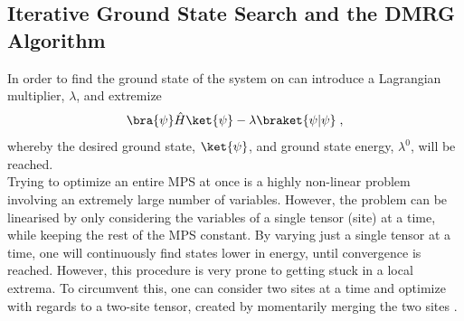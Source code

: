 \subsection{Iterative Ground State Search and the DMRG Algorithm} \label{sec:DMRG}
In order to find the ground state of the system on can introduce a Lagrangian multiplier, $\lambda$, and extremize
\begin{equation}
	\bra{\psi} \hat{H} \ket{\psi} - \lambda \braket{\psi | \psi} \; ,
	\label{eq:lagrange}
\end{equation}
whereby the desired ground state, $\ket{\psi}$, and ground state energy, $\lambda^0$, will be reached.\\
Trying to optimize an entire MPS at once is a highly non-linear problem involving an extremely large number of variables. However, the problem can be linearised by only considering the variables of a single tensor (site) at a time, while keeping the rest of the MPS constant. By varying just a single tensor at a time, one will continuously find states lower in energy, until convergence is reached. However, this procedure is very prone to getting stuck in a local extrema. To circumvent this, one can consider two sites at a time and optimize with regards to a two-site tensor, created by momentarily merging the two sites \cite{White1993}.

